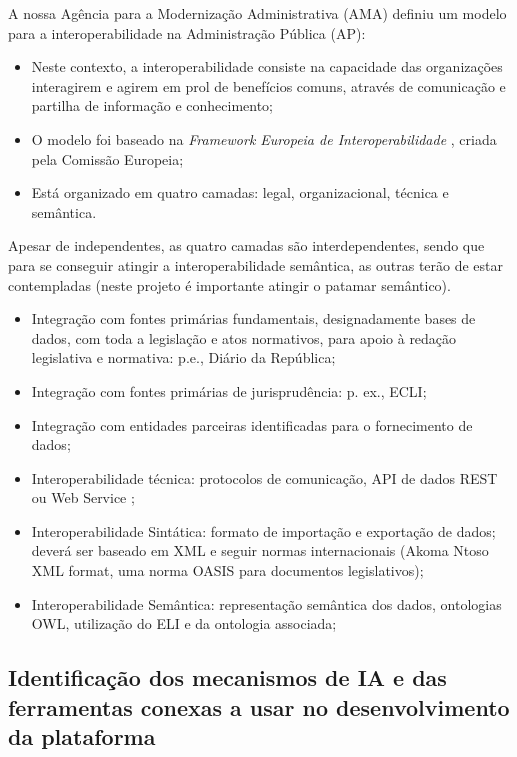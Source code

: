 A nossa Agência para a Modernização Administrativa (AMA)  definiu um modelo para a interoperabilidade na 
Administração Pública (AP):
\begin{itemize}
\item Neste contexto, a interoperabilidade consiste na capacidade das organizações interagirem 
e agirem em prol de benefícios comuns, através de comunicação e partilha de informação e conhecimento;
\item O modelo foi baseado na \emph{Framework Europeia de Interoperabilidade} \cite{EIF}, criada pela Comissão Europeia;
\item Está organizado em quatro camadas: legal, organizacional, técnica e semântica.
\end{itemize}

Apesar de independentes, as quatro camadas são interdependentes, sendo que para se conseguir atingir a interoperabilidade 
semântica, as outras terão de estar contempladas (neste projeto é importante atingir o patamar semântico).

\begin{itemize}
\item Integração com fontes primárias fundamentais, designadamente bases de dados, com toda a
legislação e atos normativos, para apoio à redação legislativa e normativa: p.e., Diário da
República;
\item Integração com fontes primárias de jurisprudência: p. ex., ECLI;
\item Integração com entidades parceiras identificadas para o fornecimento de dados;
\item Interoperabilidade técnica: protocolos de comunicação, API de dados REST ou Web Service ;
\item Interoperabilidade Sintática: formato de importação e exportação de dados; deverá ser baseado
em XML e seguir normas internacionais (Akoma Ntoso XML format, uma norma OASIS para
documentos legislativos);
\item Interoperabilidade Semântica: representação semântica dos dados, ontologias OWL, utilização
do ELI e da ontologia associada;
\end{itemize}

\subsection{Identificação dos mecanismos de IA e das ferramentas conexas a usar no desenvolvimento
da plataforma}

